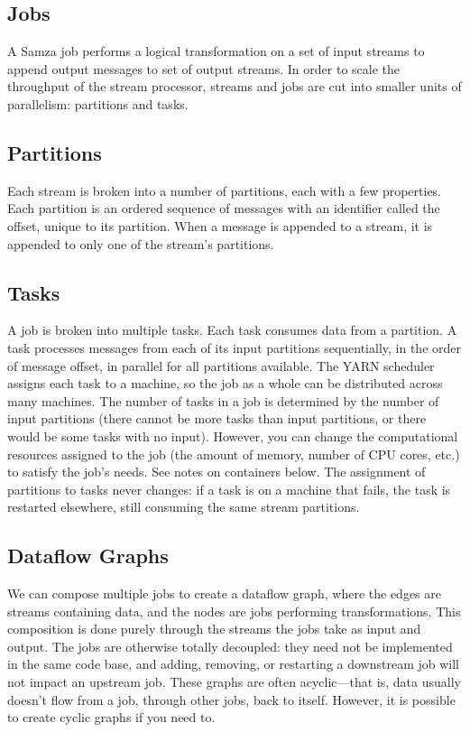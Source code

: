 \documentclass[9pt,twocolumn,twoside]{styles/osajnl}
\begin{document}
\subsection{Jobs}
A Samza job performs a logical transformation on a set of input streams to
append output messages to set of output streams. In order to scale the
throughput of the stream processor, streams and jobs are cut into smaller units
of parallelism: partitions and tasks.\cite{www-samza}

\subsection{Partitions}
Each stream is broken into a number of partitions, each with a few properties.
Each partition is an ordered sequence of messages with an identifier called the
offset, unique to its partition. When a message is appended to a stream, it is
appended to only one of the stream’s partitions.\cite{www-samza}

\subsection{Tasks}
A job is broken into multiple tasks. Each task consumes data from a partition. A
task processes messages from each of its input partitions sequentially, in the
order of message offset, in parallel for all partitions available. The YARN
scheduler assigns each task to a machine, so the job as a whole can be
distributed across many machines. The number of tasks in a job is determined by
the number of input partitions (there cannot be more tasks than input
partitions, or there would be some tasks with no input). However, you can change
the computational resources assigned to the job (the amount of memory, number of
CPU cores, etc.) to satisfy the job’s needs. See notes on containers below. The
assignment of partitions to tasks never changes: if a task is on a machine that
fails, the task is restarted elsewhere, still consuming the same stream
partitions.\cite{www-samza}\cite{paper5}

\subsection{Dataflow Graphs}
We can compose multiple jobs to create a dataflow graph, where the edges are
streams containing data, and the nodes are jobs performing transformations. This
composition is done purely through the streams the jobs take as input and
output. The jobs are otherwise totally decoupled: they need not be implemented
in the same code base, and adding, removing, or restarting a downstream job will
not impact an upstream job. These graphs are often acyclic—that is, data usually
doesn’t flow from a job, through other jobs, back to itself. However, it is
possible to create cyclic graphs if you need to.\cite{www-samza}
\end{document}
